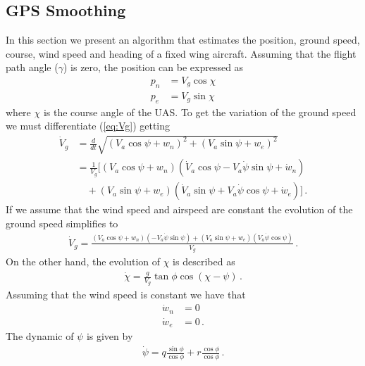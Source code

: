 \subsection{GPS Smoothing}
In this section we present an algorithm that estimates the position, ground speed, course, wind speed and heading of a fixed wing aircraft. Assuming that the flight path angle ($\gamma$) is zero, the position can be expressed as
\begin{align*}
p_n&=V_g\cos\chi \\
p_e&=V_g\sin\chi
\end{align*}
where $\chi$ is the course angle of the UAS.
To get the variation of the ground speed we must differentiate (\ref{eq:Vg}) getting
\begin{align*}
\dot{V}_g &= \frac{d}{dt}\sqrt{(V_a\cos\psi+w_n)^2+(V_a\sin\psi+w_e)^2} \\
		  &= \frac{1}{V_g}[(V_a\cos\psi+w_n)(\dot{V}_a\cos\psi-V_a\dot{\psi}\sin\psi+\dot{w}_n)\\
		  & \quad +(V_a\sin\psi+w_e)(\dot{V}_a\sin\psi+V_a\dot{\psi}\cos\psi+\dot{w}_e)]\,.
\end{align*}
If we assume that the wind speed and airspeed are constant the evolution of the ground speed simplifies to
\begin{align*}
\dot{V}_g=\frac{(V_a\cos\psi+w_n)(-V_a\dot{\psi}\sin\psi)+(V_a\sin\psi+w_e)(V_a\dot{\psi}\cos\psi)}{V_g}\,.
\end{align*}
On the other hand, the evolution of $\chi$ is described as
\begin{align*}
\dot{\chi}=\frac{g}{V_g}\tan\phi\cos(\chi-\psi)\,.
\end{align*}
Assuming that the wind speed is constant we have that
\begin{align*}
\dot{w}_n&=0 \\
\dot{w}_e&=0\,.
\end{align*}
The dynamic of $\psi$ is given by
\begin{align*}
\dot{\psi}=q\frac{\sin\phi}{\cos\phi}+r\frac{\cos\phi}{\cos\phi}\,.
\end{align*}

